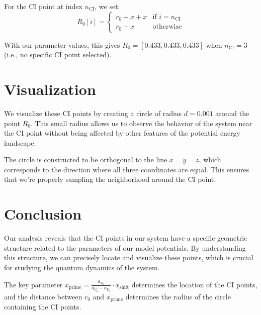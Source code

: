 \documentclass{article}
\begin{document}
For the CI point at index $n_{\text{CI}}$, we set:
\begin{equation}
R_0[i] = 
\begin{cases}
r_0 + x + x & \text{if } i = n_{\text{CI}} \\
r_0 - x & \text{otherwise}
\end{cases}
\end{equation}

With our parameter values, this gives $R_0 = [0.433, 0.433, 0.433]$ when $n_{\text{CI}} = 3$ (i.e., no specific CI point selected).

\section{Visualization}

We visualize these CI points by creating a circle of radius $d = 0.001$ around the point $R_0$. This small radius allows us to observe the behavior of the system near the CI point without being affected by other features of the potential energy landscape.

The circle is constructed to be orthogonal to the line $x = y = z$, which corresponds to the direction where all three coordinates are equal. This ensures that we're properly sampling the neighborhood around the CI point.

\section{Conclusion}

Our analysis reveals that the CI points in our system have a specific geometric structure related to the parameters of our model potentials. By understanding this structure, we can precisely locate and visualize these points, which is crucial for studying the quantum dynamics of the system.

The key parameter $x_{\text{prime}} = \frac{a_{V_a}}{a_{V_a} - a_{V_x}} \cdot x_{\text{shift}}$ determines the location of the CI points, and the distance between $r_0$ and $x_{\text{prime}}$ determines the radius of the circle containing the CI points.
\end{document}
